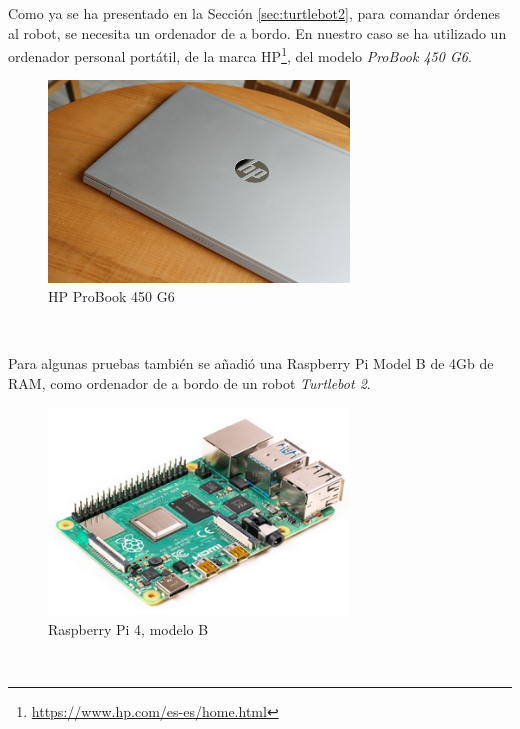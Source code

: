 Como ya se ha presentado en la Sección \ref{sec:turtlebot2}, para comandar
órdenes al robot, se necesita un ordenador de a bordo.
En nuestro caso se ha utilizado un ordenador personal portátil, de la marca
HP\footnote{\url{https://www.hp.com/es-es/home.html}}, del modelo
\textit{ProBook 450 G6}.

\begin{figure} [h!]
  \begin{center}
    \includegraphics[width=8cm]{figs/hp_probook}
  \end{center}
  \caption{HP ProBook 450 G6 \cite{hp_probook}}
  \label{fig:hp_probook}
\end{figure}\

Para algunas pruebas también se añadió una Raspberry Pi Model B de 4Gb de RAM,
como ordenador de a bordo de un robot \textit{Turtlebot 2}.

\begin{figure} [h!]
  \begin{center}
    \includegraphics[width=8cm]{figs/raspberry_pi_4b}
  \end{center}
  \caption{Raspberry Pi 4, modelo B \cite{raspberry_pi_4b}}
  \label{fig:raspberry_pi}
\end{figure}\


